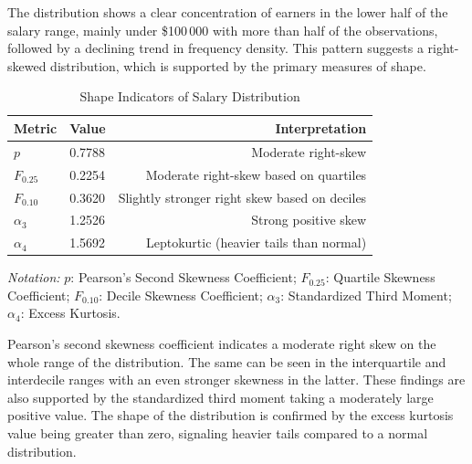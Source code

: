 \documentclass[12pt, a4paper, titlepage]{article}
\begin{document}
The distribution shows a clear concentration of earners in the lower half of the salary range, mainly under \$100\,000 with more than half of the observations, followed by a declining trend in frequency density. This pattern suggests a right-skewed distribution, which is supported by the primary measures of shape.
\begin{table}[htbp]
    \centering
    \begin{threeparttable}
        \caption{Shape Indicators of Salary Distribution}
        \label{tab:shape_metrics}
        \begin{tabular}{llr}
            \toprule
            \textbf{Metric} & \textbf{Value} & \textbf{Interpretation}                       \\
            \midrule
            $p$             & 0.7788         & Moderate right-skew                           \\
            $F_{0.25}$      & 0.2254         & Moderate right-skew based on quartiles        \\
            $F_{0.10}$      & 0.3620         & Slightly stronger right skew based on deciles \\
            $\alpha_3$      & 1.2526         & Strong positive skew                          \\
            $\alpha_4$      & 1.5692         & Leptokurtic (heavier tails than normal)       \\
            \bottomrule
        \end{tabular}
        \begin{tablenotes}\footnotesize\raggedright
            \item{\textit{Notation:}}
            $p$: Pearson's Second Skewness Coefficient;
            $F_{0.25}$: Quartile Skewness Coefficient;
            $F_{0.10}$: Decile Skewness Coefficient;
            $\alpha_3$: Standardized Third Moment;
            $\alpha_4$: Excess Kurtosis.
        \end{tablenotes}
    \end{threeparttable}
\end{table}
\par Pearson's second skewness coefficient indicates a moderate right skew on the whole range of the distribution. The same can be seen in the interquartile and interdecile ranges with an even stronger skewness in the latter. These findings are also supported by the standardized third moment taking a moderately large positive value. The shape of the distribution is confirmed by the excess kurtosis value being greater than zero, signaling heavier tails compared to a normal distribution.
\end{document}

